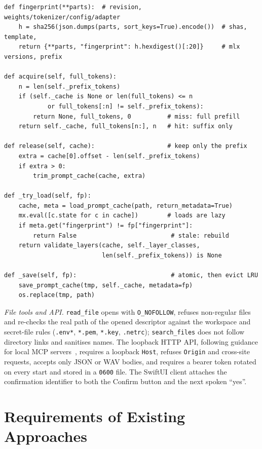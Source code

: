 \documentclass[journal]{IEEEtran}
\theoremstyle{definition}
\begin{document}
\begin{lstlisting}[caption={Acquire, release and fingerprinted persistence (abridged from \texttt{models/kv\_cache.py}).},label={lst:kv},float=t]
def fingerprint(**parts):  # revision, weights/tokenizer/config/adapter
    h = sha256(json.dumps(parts, sort_keys=True).encode())  # shas, template,
    return {**parts, "fingerprint": h.hexdigest()[:20]}     # mlx versions, prefix

def acquire(self, full_tokens):
    n = len(self._prefix_tokens)
    if (self._cache is None or len(full_tokens) <= n
            or full_tokens[:n] != self._prefix_tokens):
        return None, full_tokens, 0          # miss: full prefill
    return self._cache, full_tokens[n:], n   # hit: suffix only

def release(self, cache):                    # keep only the prefix
    extra = cache[0].offset - len(self._prefix_tokens)
    if extra > 0:
        trim_prompt_cache(cache, extra)

def _try_load(self, fp):
    cache, meta = load_prompt_cache(path, return_metadata=True)
    mx.eval([c.state for c in cache])        # loads are lazy
    if meta.get("fingerprint") != fp["fingerprint"]:
        return False                          # stale: rebuild
    return validate_layers(cache, self._layer_classes,
                           len(self._prefix_tokens)) is None

def _save(self, fp):                          # atomic, then evict LRU
    save_prompt_cache(tmp, self._cache, metadata=fp)
    os.replace(tmp, path)
\end{lstlisting}

\emph{File tools and API.} \texttt{read\_file} opens with \texttt{O\_NOFOLLOW}, refuses non-regular
files and re-checks the real path of the opened descriptor against the workspace and secret-file
rules (\texttt{.env*}, \texttt{*.pem}, \texttt{*.key}, \texttt{.netrc}); \texttt{search\_files}
does not follow directory links and sanitises names. The loopback HTTP API, following guidance for
local MCP servers~\cite{mcpsecurity2025}, requires a loopback \texttt{Host}, refuses
\texttt{Origin} and cross-site requests, accepts only JSON or WAV bodies, and requires a bearer token
rotated on every start and stored in a \texttt{0600} file. The SwiftUI client attaches the
confirmation identifier to both the Confirm button and the next spoken ``yes''.

\section{Requirements of Existing Approaches}\label{app:why}
\end{document}
